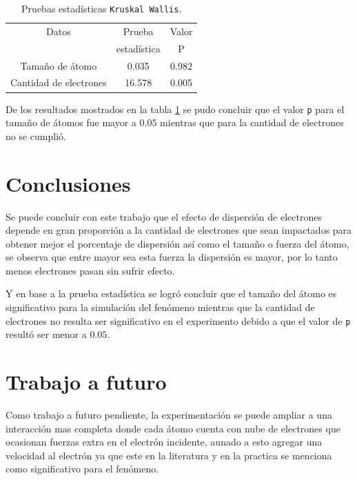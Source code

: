 \documentclass[3pt,twocolumn]{elsarticle}
\begin{document}
\begin{table}[h!]
    \centering
    \caption{Pruebas estadísticas \texttt{Kruskal Wallis}.}
    \begin{tabular}{|c|c|c|}
       \hline
        Datos & Prueba & Valor\\
       & estadística & P \\
       \hline
       Tamaño de átomo& 0.035 & 0.982 \\
       Cantidad de electrones& 16.578 & 0.005 \\
       \hline
    \end{tabular}
    \label{tabla2}
\end{table} 
De los resultados mostrados en la tabla \ref{tabla2} se pudo concluir que el valor \texttt{p} para el tamaño de átomos fue mayor a 0.05 mientras que para la cantidad de electrones no se cumplió. 

\section{Conclusiones}
Se puede concluir con este trabajo que el efecto de dispersión de electrones depende en gran proporción a la cantidad de electrones que sean impactados para obtener mejor el porcentaje de dispersión así como el tamaño o fuerza del átomo, se observa que entre mayor sea esta fuerza la dispersión es mayor, por lo tanto menos electrones pasan sin sufrir efecto.

Y en base a la prueba estadística se logró concluir que el tamaño del átomo es significativo para la simulación del fenómeno mientras que la cantidad de electrones no resulta ser significativo en el experimento debido a que el valor de \texttt{p} resultó ser menor a $0.05$.

\section{Trabajo a futuro}
Como trabajo a futuro pendiente, la experimentación se puede ampliar a una interacción mas completa donde cada átomo cuenta con nube de electrones que ocasionan fuerzas extra en el electrón incidente, aunado a esto agregar una velocidad al electrón ya que este en la literatura y en la practica se menciona como significativo para el fenómeno.



\end{document}
